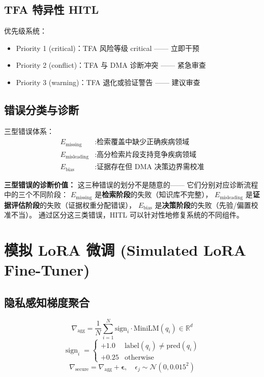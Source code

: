 \documentclass[11pt,a4paper]{ctexart}
\theoremstyle{remark}
\begin{document}
\subsection{TFA 特异性 HITL}

优先级系统：
\begin{itemize}[nosep]
\item Priority 1 (critical)：TFA 风险等级 critical —— 立即干预
\item Priority 2 (conflict)：TFA 与 DMA 诊断冲突 —— 紧急审查
\item Priority 3 (warning)：TFA 退化或验证警告 —— 建议审查
\end{itemize}

\subsection{错误分类与诊断}

三型错误体系：
\begin{align}
E_{\text{missing}} &: \text{检索覆盖中缺少正确疾病领域} \\
E_{\text{misleading}} &: \text{高分检索片段支持竞争疾病领域} \\
E_{\text{bias}} &: \text{证据存在但 DMA 决策边界需校准}
\end{align}

\textbf{三型错误的诊断价值：} 这三种错误的划分不是随意的——
它们分别对应诊断流程中的三个不同阶段：
$E_{\text{missing}}$ 是\textbf{检索阶段}的失败（知识库不完整），
$E_{\text{misleading}}$ 是\textbf{证据评估阶段}的失败（证据权重分配错误），
$E_{\text{bias}}$ 是\textbf{决策阶段}的失败（先验/偏置校准不当）。
通过区分这三类错误，HITL 可以针对性地修复系统的不同组件。

\section{模拟 LoRA 微调 (Simulated LoRA Fine-Tuner)}

\subsection{隐私感知梯度聚合}

\begin{equation}
\nabla_{\text{agg}} = \frac{1}{N}\sum_{i=1}^{N} \text{sign}_i \cdot \text{MiniLM}(q_i) \in \mathbb{R}^{d}
\end{equation}
\begin{equation}
\operatorname{sign}_i =
\begin{cases}
+1.0 & \text{label}(q_i) \neq \text{pred}(q_i) \\
+0.25 & \text{otherwise}
\end{cases}
\end{equation}
\begin{equation}
\nabla_{\text{secure}} = \nabla_{\text{agg}} + \boldsymbol{\epsilon}, \quad \epsilon_j \sim \mathcal{N}(0, 0.015^2)
\end{equation}
\end{document}

